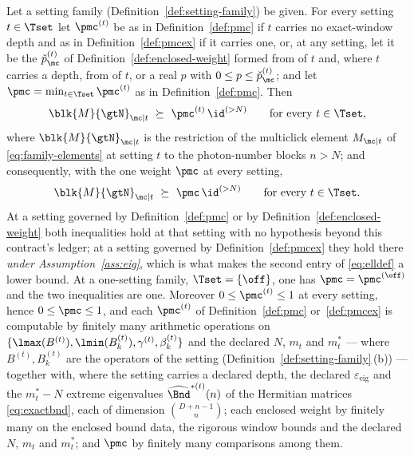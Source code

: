 \begin{theorem}\label{thm:emitted-bound}
Let a setting family (Definition~\ref{def:setting-family}) be given. For
every setting $t\in\Tset$ let $\pmc^{(t)}$ be as in
Definition~\ref{def:pmc} if $t$ carries no exact-window depth and as in
Definition~\ref{def:pmcex} if it carries one, or, at any setting, let it be
the  $\check p^{(t)}_{\mc}$ of
Definition~\ref{def:enclosed-weight} formed from  of
$t$ and, where $t$ carries a depth, from  of $t$,
or a real $p$ with $0\le p\le\check p^{(t)}_{\mc}$;
and let $\pmc=\min_{t\in\Tset}\pmc^{(t)}$ as in Definition~\ref{def:pmc}. Then
\begin{equation}\label{eq:pmcsetting}
  \blk{M}{\gtN}_{\mc|t}\ \succeq\ \pmc^{(t)}\,\id^{(>N)}
  \qquad\text{for every }t\in\Tset ,
\end{equation}
where $\blk{M}{\gtN}_{\mc|t}$ is the restriction of the multiclick element
$M_{\mc|t}$ of \eqref{eq:family-elements} at setting $t$ to the photon-number
blocks $n>N$; and consequently, with the one weight $\pmc$ at every setting,
\begin{equation}\label{eq:pmcstatement}
  \blk{M}{\gtN}_{\mc|t}\ \succeq\ \pmc\,\id^{(>N)}
  \qquad\text{for every }t\in\Tset .
\end{equation}
At a setting governed by Definition~\ref{def:pmc} or by
Definition~\ref{def:enclosed-weight} both inequalities hold at
that setting with no hypothesis beyond this contract's ledger; at a setting
governed by Definition~\ref{def:pmcex} they hold there \emph{under
Assumption~\ref{ass:eig}}, which is what makes the second entry of
\eqref{eq:elldef} a lower bound. At a
one-setting family, $\Tset=\{\off\}$, one has $\pmc=\pmc^{(\off)}$ and the
two inequalities are one. Moreover $0\le\pmc^{(t)}\le1$ at every setting,
hence $0\le\pmc\le1$, and each $\pmc^{(t)}$ of Definition~\ref{def:pmc}
or~\ref{def:pmcex} is computable by finitely many
arithmetic operations on
$\{\lmax(B^{(t)}),\lmin(B^{(t)}_k),\gamma^{(t)},\beta^{(t)}_k\}$ and the
declared $N$, $m_t$ and $m^{\ast}_t$ --- where $B^{(t)},B^{(t)}_k$ are the
operators of the setting (Definition~\ref{def:setting-family}\,(b)) ---
together with, where the setting carries a declared depth, the declared
$\varepsilon_{\mathrm{eig}}$ and the $m^{\ast}_t-N$ extreme eigenvalues
$\widehat\Bnd^{\ast(t)}(n)$ of the Hermitian matrices \eqref{eq:exactbnd},
each of dimension $\binom{D+n-1}{n}$; each enclosed weight by finitely many
on the enclosed bound data, the rigorous window bounds and the declared $N$,
$m_t$ and $m^{\ast}_t$; and $\pmc$ by finitely many comparisons among them.
\end{theorem}

